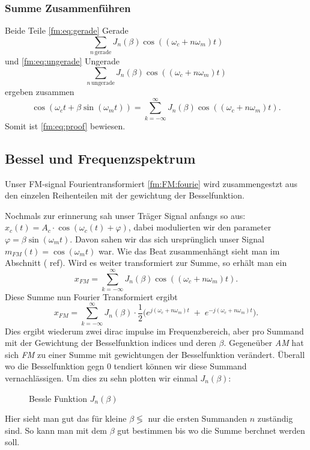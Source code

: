 \subsubsection{Summe Zusammenführen}
Beide Teile \eqref{fm:eq:gerade} Gerade 
\[
    \sum_{n\, \text{gerade}} J_{n}(\beta) \cos((\omega_c + n\omega_m) t)
\]
und \eqref{fm:eq:ungerade} Ungerade 
\[
    \sum_{n\, \text{ungerade}} J_{n}(\beta) \cos((\omega_c + n\omega_m) t)
\]
ergeben zusammen
\[
    \cos(\omega_ct+\beta\sin(\omega_mt))
    =
    \sum_{k= -\infty}^\infty J_{n}(\beta) \cos((\omega_c+ n\omega_m)t).
\]
Somit ist \eqref{fm:eq:proof} bewiesen.
\newpage
\subsection{Bessel und Frequenzspektrum}
Unser FM-signal Fourientransformiert \eqref{fm:FM:fourie} wird zusammengestzt aus den einzelen Reihenteilen mit der gewichtung der Besselfunktion.


Nochmals zur erinnerung sah unser Träger Signal anfangs so aus:
\(x_c(t) = A_c \cdot \cos(\omega_c(t)+\varphi)\), dabei modulierten wir den parameter \( \varphi = \beta\sin(\omega_mt) \).
Davon sahen wir das sich ursprünglich unser Signal\(m_{FM}(t) = \cos(\omega_m t)\) war. 
Wie das Beat zusammenhängt sieht man im Abschnitt ( ref). 
Wird es weiter transformiert zur Summe, so erhält man ein
\[
    x_{FM} = 
    \sum_{k= -\infty}^\infty J_{n}(\beta) \cos((\omega_c+ n\omega_m)t).
\]
Diese Summe nun Fourier Transformiert ergibt
\[
    x_{FM} = 
    \sum_{k= -\infty}^\infty J_{n}(\beta) \cdot \frac{1}{2} \biggl(  e^{j(\omega_c+ n\omega_m)t}\;+\; e^{-j(\omega_c+ n\omega_m)t}\biggr).
\]
Dies ergibt wiederum zwei dirac impulse im Frequenzbereich, aber pro Summand mit der Gewichtung der Besselfunktion indices und deren \(\beta\). 
Gegeneüber \textit{AM} hat sich \textit{FM} zu einer Summe mit gewichtungen der Besselfunktion verändert.
Überall wo die Besselfunktion gegn 0 tendiert können wir diese Summand vernachlässigen.
Um dies zu sehn plotten wir einmal \(J_{n}(\beta)\):
\begin{figure}
	\centering
	
	\caption{Bessle Funktion \(J_{n}(\beta)\)}
	\label{fig:bessel}
\end{figure}
Hier sieht man gut das für kleine \( \beta \lessgtr \) nur die ersten Summanden \( n\) zuständig sind.
So kann man mit dem \(\beta\) gut bestimmen bis wo die Summe berchnet werden soll. 

